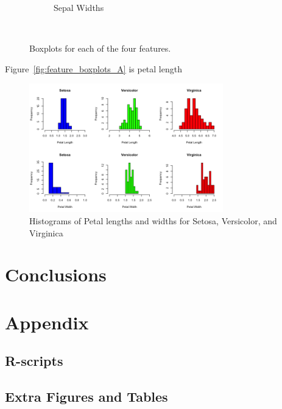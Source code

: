 \documentclass{article}
\begin{document}
\begin{figure}[H]
\begin{subfigure}{0.375\textwidth}
        \caption{Sepal Widths}
        \label{fig:feature_boxplots_D}
    \end{subfigure}\\
    \caption{Boxplots for each of the four features.}
    \label{fig:feature_boxplots}
\end{figure}

Figure~\ref{fig:feature_boxplots_A} is petal length

\begin{figure}[H]
	\centering
	\includegraphics[width=0.75\textwidth]{hist_iris.png}
	\caption{Histograms of Petal lengths and widths for Setosa, Versicolor, and Virginica}
	\label{fig:hist_iris}
\end{figure}

\section{Conclusions}

\section{Appendix}

\subsection{R-scripts}
\subsection{Extra Figures and Tables} 
\end{document}
